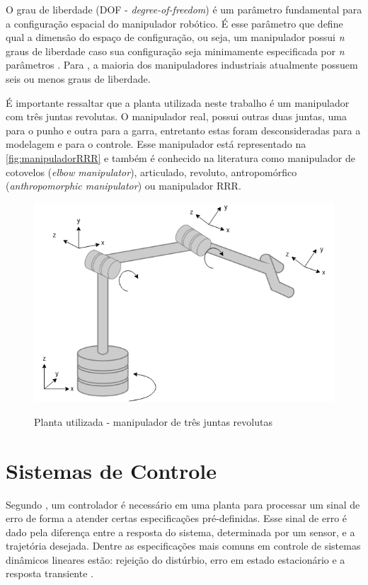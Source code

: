 O grau de liberdade (DOF - \textit{degree-of-freedom}) é um parâmetro fundamental para 
a configuração espacial do manipulador robótico. É esse parâmetro que define qual a dimensão do 
espaço de configuração, ou seja, um manipulador possui \textit{n} graus de liberdade caso sua 
configuração seja minimamente especificada por \textit{n} parâmetros \cite{Spong}. Para 
, a maioria dos manipuladores industriais atualmente possuem seis 
ou menos graus de liberdade.

É importante ressaltar que a planta utilizada neste trabalho é um manipulador com três juntas
revolutas. O manipulador real, possui outras duas juntas, uma para o punho e outra para a garra, entretanto estas 
foram desconsideradas para a modelagem e para o controle. Esse manipulador está representado na \autoref{fig:manipuladorRRR} e 
também é conhecido na literatura como manipulador de cotovelos (\textit{elbow manipulator}), articulado, revoluto, 
antropomórfico (\textit{anthropomorphic manipulator}) ou manipulador RRR.

\begin{figure}[ht]
  \centering
  \caption{Planta utilizada - manipulador de três juntas revolutas}
  \includegraphics[width = 0.5\columnwidth]{Imagens/manipulador.png}
  \label{fig:manipuladorRRR} 
\end{figure}

\section{Sistemas de Controle}

Segundo , um controlador é necessário em uma planta 
para processar um sinal de erro de forma a atender certas especificações pré-definidas. 
Esse sinal de erro é dado pela diferença entre a resposta do sistema, 
determinada por um sensor, e a trajetória desejada. Dentre as especificações mais 
comuns em controle de sistemas dinâmicos lineares estão: rejeição do 
distúrbio, erro em estado estacionário e a resposta transiente \cite{Ogata}.

